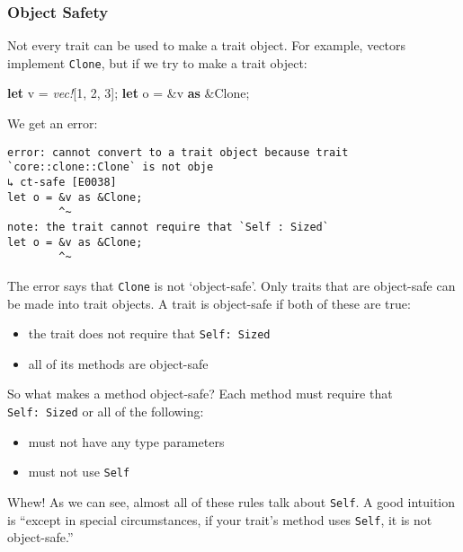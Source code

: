 \documentclass[a4paper,]{book}
\newenvironment{Shaded}{\begin{snugshade}}{\end{snugshade}}
\newcommand{\KeywordTok}[1]{\textcolor[rgb]{0.13,0.29,0.53}{\textbf{{#1}}}}
\newcommand{\DecValTok}[1]{\textcolor[rgb]{0.00,0.00,0.81}{{#1}}}
\newcommand{\BuiltInTok}[1]{{#1}}
\newcommand{\PreprocessorTok}[1]{\textcolor[rgb]{0.56,0.35,0.01}{\textit{{#1}}}}
\newcommand{\NormalTok}[1]{{#1}}
\providecommand{\tightlist}{%
  \setlength{\itemsep}{0pt}\setlength{\parskip}{0pt}}
\begin{document}
\subsubsection{Object Safety}\label{object-safety}

Not every trait can be used to make a trait object. For example, vectors
implement \texttt{Clone}, but if we try to make a trait object:

\begin{Shaded}
\begin{Highlighting}[]
\KeywordTok{let} \NormalTok{v = }\PreprocessorTok{vec!}\NormalTok{[}\DecValTok{1}\NormalTok{, }\DecValTok{2}\NormalTok{, }\DecValTok{3}\NormalTok{];}
\KeywordTok{let} \NormalTok{o = &v }\KeywordTok{as} \NormalTok{&}\BuiltInTok{Clone}\NormalTok{;}
\end{Highlighting}
\end{Shaded}

We get an error:

\begin{verbatim}
error: cannot convert to a trait object because trait `core::clone::Clone` is not obje
↳ ct-safe [E0038]
let o = &v as &Clone;
        ^~
note: the trait cannot require that `Self : Sized`
let o = &v as &Clone;
        ^~
\end{verbatim}

The error says that \texttt{Clone} is not `object-safe'. Only traits
that are object-safe can be made into trait objects. A trait is
object-safe if both of these are true:

\begin{itemize}
\tightlist
\item
  the trait does not require that \texttt{Self:\ Sized}
\item
  all of its methods are object-safe
\end{itemize}

So what makes a method object-safe? Each method must require that
\texttt{Self:\ Sized} or all of the following:

\begin{itemize}
\tightlist
\item
  must not have any type parameters
\item
  must not use \texttt{Self}
\end{itemize}

Whew! As we can see, almost all of these rules talk about \texttt{Self}.
A good intuition is ``except in special circumstances, if your trait's
method uses \texttt{Self}, it is not object-safe.''
\end{document}
